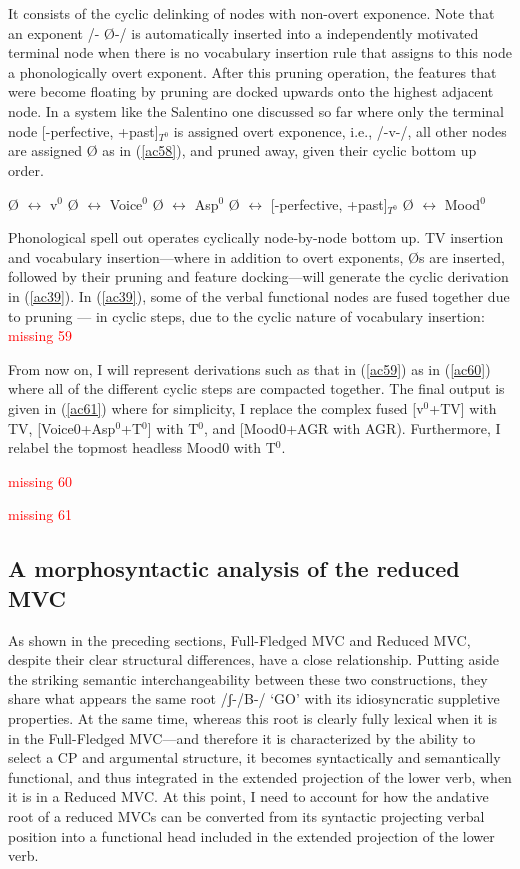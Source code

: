 \documentclass[output=paper]{langscibook}
\begin{document}
It consists of the cyclic delinking of nodes with non-overt exponence. Note that an exponent /- Ø-/ is automatically  inserted  into a independently motivated  terminal node when there is no vocabulary insertion rule that assigns to this node a phonologically overt exponent.  After this pruning operation, the features that were become floating by pruning are docked upwards onto the highest adjacent node.  In a system like the Salentino one discussed so far where only the terminal node [-perfective, +past]$_{T^0}$ is assigned overt exponence, i.e., /-v-/, all other nodes are assigned Ø as in (\ref{ac58}), and pruned away, given their cyclic bottom up order.

\ea \label{ac58}
    \ea Ø $\longleftrightarrow$ v$^0$
    \ex Ø $\longleftrightarrow$ Voice$^0$
    \ex Ø $\longleftrightarrow$ Asp$^0$
    \ex Ø $\longleftrightarrow$ [-perfective, +past]$_{T^0}$
    \ex Ø $\longleftrightarrow$ Mood$^0$
    \z
\z

Phonological spell out operates cyclically node-by-node bottom up.  TV insertion and vocabulary insertion—where in addition to overt exponents, Øs are inserted, followed by their pruning and feature docking—will generate the cyclic derivation in (\ref{ac39}). In (\ref{ac39}), some of the verbal functional nodes are fused together due to pruning — in cyclic steps, due to the cyclic nature of vocabulary insertion: 
\ea \label{ac59}
\textcolor{red}{missing 59}
\z

From now on, I will represent derivations such as that in (\ref{ac59}) as in (\ref{ac60}) where all of the different cyclic steps are compacted together.  The final output is given in (\ref{ac61}) where for simplicity, I replace the complex fused [v$^0$+TV] with TV, [Voice0+Asp$^0$+T$^0$] with T$^0$, and  [Mood0+AGR with AGR). Furthermore, I relabel the topmost headless Mood0 with T$^0$.

\ea \label{ac60}
\textcolor{red}{missing 60}
\z

\ea \label{ac61}
\textcolor{red}{missing 61}
\z

\subsection{A morphosyntactic analysis of the reduced MVC}

As shown in the preceding sections, Full-Fledged MVC and Reduced MVC, despite their clear structural differences, have a close relationship. Putting aside the striking semantic interchangeability between these two constructions, they share what appears the same root /ʃ-/B-/ ‘GO’ with its idiosyncratic suppletive properties. At the same time, whereas this root is clearly fully lexical when it is in the  Full-Fledged MVC—and therefore it is characterized by the ability to select a CP and argumental structure, it becomes syntactically and semantically functional, and thus integrated in the extended projection of the lower verb, when it is in a Reduced MVC.  At this point, I need to account for how the andative root of a reduced MVCs can be converted from its syntactic projecting verbal position into a functional head included in the extended projection of the lower verb.
\end{document}
